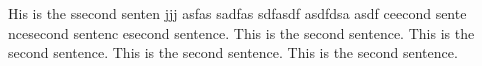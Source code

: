His is the	      ssecond senten jjj asfas sadfas sdfasdf asdfdsa asdf ceecond sente ncesecond sentenc esecond sentence. This is the	      second sentence. This is the	      second sentence. This is the	      second sentence. This is the	      second sentence.
